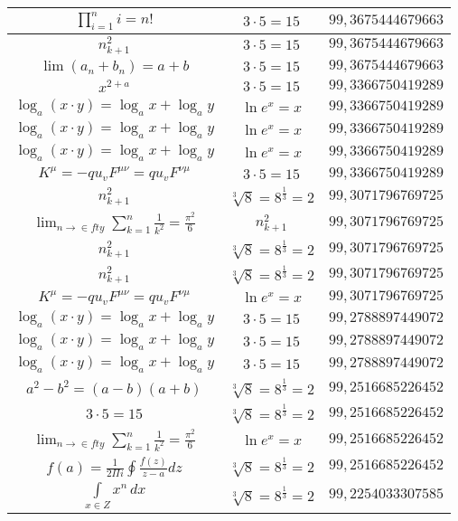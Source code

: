\documentclass{article}
\begin{document}
\begin{flushleft}
\begin{longtable}{|c|c|c|}
$\prod_{i=1}^ni=n!$ & $3\cdot 5=15$ & $99,3675444679663$ \\ \hline 
$n_{k+1}^2$ & $3\cdot 5=15$ & $99,3675444679663$ \\ \hline 
$\lim\left(a_n+b_n\right)=a+b$ & $3\cdot 5=15$ & $99,3675444679663$ \\ \hline 
$x^{2+a}$ & $3\cdot 5=15$ & $99,3366750419289$ \\ \hline 
$\log_{a}(x\cdot y)=\log_{a}x+\log_{a}y$ & $\ln e^x=x$ & $99,3366750419289$ \\ \hline 
$\log_{a}(x\cdot y)=\log_{a}x+\log_{a}y$ & $\ln e^x=x$ & $99,3366750419289$ \\ \hline 
$\log_{a}(x\cdot y)=\log_{a}x+\log_{a}y$ & $\ln e^x=x$ & $99,3366750419289$ \\ \hline 
$K^\mu=-qu_vF^{\mu\nu}=qu_vF^{\nu\mu}$ & $3\cdot 5=15$ & $99,3366750419289$ \\ \hline 
$n_{k+1}^2$ & $\sqrt[3]{8}=8^{\frac{1}{3}}=2$ & $99,3071796769725$ \\ \hline 
$\lim_{n\to\in fty}\sum_{k=1}^n\frac{1}{k^2}=\frac{\pi^2}{6}$ & $n_{k+1}^2$ & $99,3071796769725$ \\ \hline 
$n_{k+1}^2$ & $\sqrt[3]{8}=8^{\frac{1}{3}}=2$ & $99,3071796769725$ \\ \hline 
$n_{k+1}^2$ & $\sqrt[3]{8}=8^{\frac{1}{3}}=2$ & $99,3071796769725$ \\ \hline 
$K^\mu=-qu_vF^{\mu\nu}=qu_vF^{\nu\mu}$ & $\ln e^x=x$ & $99,3071796769725$ \\ \hline 
$\log_{a}(x\cdot y)=\log_{a}x+\log_{a}y$ & $3\cdot 5=15$ & $99,2788897449072$ \\ \hline 
$\log_{a}(x\cdot y)=\log_{a}x+\log_{a}y$ & $3\cdot 5=15$ & $99,2788897449072$ \\ \hline 
$\log_{a}(x\cdot y)=\log_{a}x+\log_{a}y$ & $3\cdot 5=15$ & $99,2788897449072$ \\ \hline 
$a^2-b^2=(a-b)(a+b)$ & $\sqrt[3]{8}=8^{\frac{1}{3}}=2$ & $99,2516685226452$ \\ \hline 
$3\cdot 5=15$ & $\sqrt[3]{8}=8^{\frac{1}{3}}=2$ & $99,2516685226452$ \\ \hline 
$\lim_{n\to\in fty}\sum_{k=1}^n\frac{1}{k^2}=\frac{\pi^2}{6}$ & $\ln e^x=x$ & $99,2516685226452$ \\ \hline 
$f\left(a\right)=\frac{1}{2\Pi i}\oint\frac{f\left(z\right)}{z-a}dz$ & $\sqrt[3]{8}=8^{\frac{1}{3}}=2$ & $99,2516685226452$ \\ \hline 
$\int \limits_{x\in Z}\!x^{n}\,dx$ & $\sqrt[3]{8}=8^{\frac{1}{3}}=2$ & $99,2254033307585$ \\ \hline 

\end{longtable}
\end{flushleft}
\end{document}
